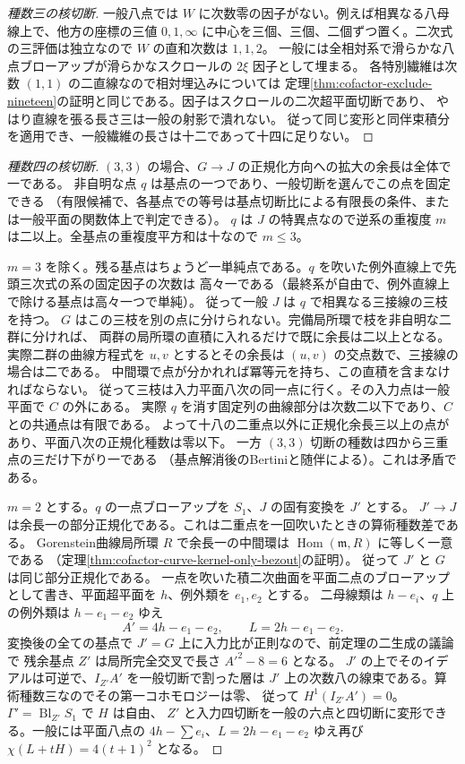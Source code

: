 \begin{proof}[種数三の核切断]
一般八点では $W$ に次数零の因子がない。例えば相異なる八母線上で、他方の座標の三値
$0,1,\infty$ に中心を三個、三個、二個ずつ置く。二次式の三評価は独立なので $W$ の直和次数は $1,1,2$。
一般には全相対系で滑らかな八点ブローアップが滑らかなスクロールの $2\xi$ 因子として埋まる。
各特別繊維は次数 $(1,1)$ の二直線なので相対埋込みについては
定理\ref{thm:cofactor-exclude-nineteen}の証明と同じである。因子はスクロールの二次超平面切断であり、
やはり直線を張る長さ三は一般の射影で潰れない。
従って同じ変形と同伴束積分を適用でき、一般繊維の長さは十二であって十四に足りない。
\end{proof}

\begin{proof}[種数四の核切断]
$(3,3)$ の場合、$G\to J$ の正規化方向への拡大の余長は全体で一である。
非自明な点 $q$ は基点の一つであり、一般切断を選んでこの点を固定できる
（有限候補で、各基点での等号は基点切断比による有限長の条件、または一般平面の関数体上で判定できる）。
$q$ は $J$ の特異点なので逆系の重複度 $m$ は二以上。全基点の重複度平方和は十なので $m\le3$。

$m=3$ を除く。残る基点はちょうど一単純点である。$q$ を吹いた例外直線上で先頭三次式の系の固定因子の次数は
高々一である（最終系が自由で、例外直線上で除ける基点は高々一つで単純）。
従って一般 $J$ は $q$ で相異なる三接線の三枝を持つ。
$G$ はこの三枝を別の点に分けられない。完備局所環で枝を非自明な二群に分ければ、
両群の局所環の直積に入れるだけで既に余長は二以上となる。
実際二群の曲線方程式を $u,v$ とするとその余長は $(u,v)$ の交点数で、三接線の場合は二である。
中間環で点が分かれれば冪等元を持ち、この直積を含まなければならない。
従って三枝は入力平面八次の同一点に行く。その入力点は一般平面で $C$ の外にある。
実際 $q$ を消す固定列の曲線部分は次数二以下であり、$C$ との共通点は有限である。
よって十八の二重点以外に正規化余長三以上の点があり、平面八次の正規化種数は零以下。
一方 $(3,3)$ 切断の種数は四から三重点の三だけ下がり一である
（基点解消後のBertiniと随伴による）。これは矛盾である。

$m=2$ とする。$q$ の一点ブローアップを $S_1$、$J$ の固有変換を $J'$ とする。
$J'\to J$ は余長一の部分正規化である。これは二重点を一回吹いたときの算術種数差である。
Gorenstein曲線局所環 $R$ で余長一の中間環は $\operatorname{Hom}(\mathfrak m,R)$ に等しく一意である
（定理\ref{thm:cofactor-curve-kernel-only-bezout}の証明）。
従って $J'$ と $G$ は同じ部分正規化である。
一点を吹いた積二次曲面を平面二点のブローアップとして書き、平面超平面を $h$、例外類を $e_1,e_2$ とする。
二母線類は $h-e_i$、$q$ 上の例外類は $h-e_1-e_2$ ゆえ
\[
        A'=4h-e_1-e_2,\qquad L=2h-e_1-e_2 .
\]
変換後の全ての基点で $J'=G$ 上に入力比が正則なので、前定理の二生成の議論で
残余基点 $Z'$ は局所完全交叉で長さ $A'^2-8=6$ となる。
$J'$ の上でそのイデアルは可逆で、$I_{Z'}A'$ を一般切断で割った層は
$J'$ 上の次数八の線束である。算術種数三なのでその第一コホモロジーは零、
従って $H^1(I_{Z'}A')=0$。$\Gamma'=\operatorname{Bl}_{Z'}S_1$ で $H$ は自由、
$Z'$ と入力四切断を一般の六点と四切断に変形できる。一般には平面八点の
$4h-\sum e_i$、$L=2h-e_1-e_2$ ゆえ再び $\chi(L+tH)=4(t+1)^2$ となる。


\end{proof}
